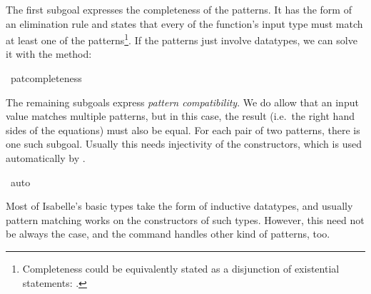 \begin{isabellebody}
\begin{isamarkuptxt}
  The first subgoal expresses the completeness of the patterns. It has
  the form of an elimination rule and states that every  of
  the function's input type must match at least one of the patterns\footnote{Completeness could
  be equivalently stated as a disjunction of existential statements: 
.}. If the patterns just involve
  datatypes, we can solve it with the 
  method:%
\end{isamarkuptxt}%
\isamarkuptrue%
\isamarkupfalse%
\ pat{\isacharunderscore}completeness%
\begin{isamarkuptxt}%
The remaining subgoals express \emph{pattern compatibility}. We do
  allow that an input value matches multiple patterns, but in this
  case, the result (i.e.~the right hand sides of the equations) must
  also be equal. For each pair of two patterns, there is one such
  subgoal. Usually this needs injectivity of the constructors, which
  is used automatically by .%
\end{isamarkuptxt}%
\isamarkuptrue%
\isamarkupfalse%
\ auto%
\endisatagproof
{\isafoldproof}%
%
\isadelimproof
%
\endisadelimproof
%
\isamarkuptrue%
%
\begin{isamarkuptext}%
Most of Isabelle's basic types take the form of inductive datatypes,
  and usually pattern matching works on the constructors of such types. 
  However, this need not be always the case, and the 
  command handles other kind of patterns, too.


\end{isamarkuptext}
\end{isabellebody}
